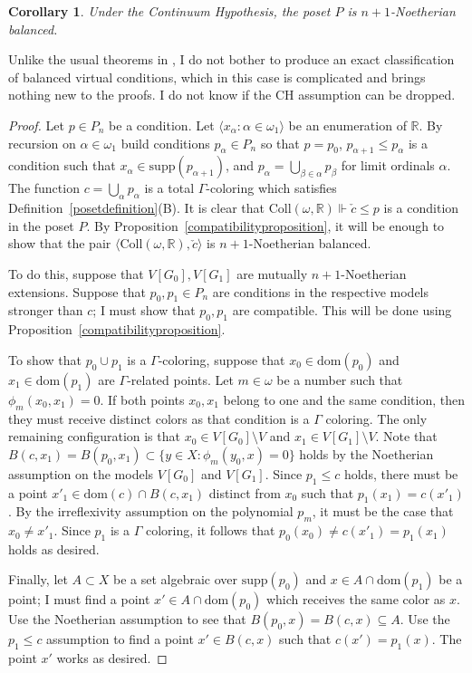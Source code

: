 \documentclass{article}
\newcommand{\ga}{\alpha}
\newcommand{\gb}{\beta}
\newcommand{\gw}{\omega}
\newcommand{\coll}{\mathrm{Coll}}
\newcommand{\supp}{\mathrm{supp}}
\newcommand{\dom}{\mathrm{dom}}
\newtheorem{corollary}[theorem]{Corollary}
\theoremstyle{definition}
\begin{document}
\begin{corollary}
\label{balancecorollary}
Under the Continuum Hypothesis, the poset $P$ is $n+1$-Noetherian balanced.
\end{corollary}

\noindent Unlike the usual theorems in \cite{z:geometric}, I do not bother to produce an exact classification of balanced virtual conditions, which in this case is complicated and brings nothing new to the proofs. I do not know if the CH assumption can be dropped.

\begin{proof}
Let $p\in P_n$ be a condition. Let $\langle x_\ga\colon\ga\in\gw_1\rangle$ be an enumeration of $\mathbb{R}$. By recursion on $\ga\in\gw_1$ build conditions $p_\ga\in P_n$ so that
$p=p_0$, $p_{\ga+1}\leq p_\ga$ is a condition such that $x_\ga\in\supp(p_{\ga+1})$, and $p_\ga=\bigcup_{\gb\in\ga}p_\gb$ for limit ordinals $\ga$. The function $c=\bigcup_\ga p_\ga$ is a total $\Gamma$-coloring which satisfies Definition~\ref{posetdefinition}(B). It is clear that $\coll(\gw, \mathbb{R})\Vdash\check c\leq p$ is a condition in the poset $P$. By Proposition~\ref{compatibilityproposition}, it will be enough to show that the pair $\langle\coll(\gw, \mathbb{R}), \check c\rangle$ is $n+1$-Noetherian balanced.

To do this, suppose that $V[G_0], V[G_1]$ are mutually $n+1$-Noetherian extensions. Suppose that $p_0, p_1\in P_n$ are conditions in the respective models stronger than $c$; I must show that $p_0, p_1$ are compatible. This will be done using Proposition~\ref{compatibilityproposition}.

To show that $p_0\cup p_1$ is a $\Gamma$-coloring, suppose that $x_0\in\dom(p_0)$ and $x_1\in\dom(p_1)$ are $\Gamma$-related points. Let $m\in\gw$ be a number such that $\phi_m( x_0, x_1)=0$. If both points $x_0, x_1$ belong to one and the same condition, then they must receive distinct colors as that condition is a $\Gamma$ coloring. The only remaining configuration is that $x_0\in V[G_0]\setminus V$ and $x_1\in V[G_1]\setminus V$. Note that $B(c, x_1)=B(p_0, x_1)\subset\{y\in X\colon \phi_m(y_0, x)=0\}$ holds by the Noetherian assumption on the models $V[G_0]$ and $V[G_1]$. Since $p_1\leq c$ holds, there must be a point $x'_1\in\dom(c)\cap B(c, x_1)$ distinct from $x_0$ such that $p_1(x_1)=c(x'_1)$. By the irreflexivity assumption on the polynomial $p_m$, it must be the case that $x_0\neq x'_1$. Since $p_1$ is a $\Gamma$ coloring, it follows that $p_0(x_0)\neq c(x'_1)=p_1(x_1)$ holds as desired.

Finally, let $A\subset X$ be a set algebraic over $\supp(p_0)$ and $x\in A\cap\dom(p_1)$ be a point; I must find a point $x'\in A\cap\dom(p_0)$ which receives the same color as $x$. Use the  Noetherian assumption to see that $B(p_0, x)=B(c, x)\subseteq A$. Use the $p_1\leq c$ assumption to find a point $x'\in B(c, x)$ such that $c(x')=p_1(x)$. The point $x'$ works as desired.
\end{proof}
\end{document}
